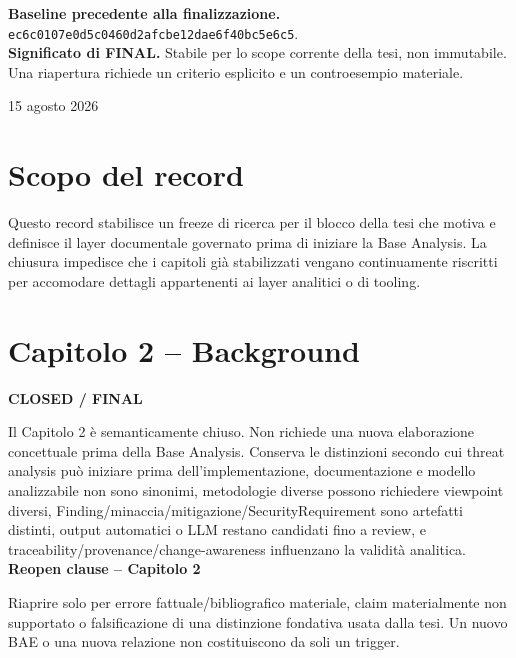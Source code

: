 \documentclass[11pt,a4paper]{article}
\newenvironment{closedbox}[1]{\def\FrameCommand{\fcolorbox{ddtagreen}{ddtagray}}\MakeFramed{\advance\hsize-2\width\FrameRestore}\noindent\textbf{#1}\par\smallskip}{\endMakeFramed}
\newenvironment{reopenbox}[1]{\def\FrameCommand{\fcolorbox{ddtaorange}{ddtagray}}\MakeFramed{\advance\hsize-2\width\FrameRestore}\noindent\textbf{#1}\par\smallskip}{\endMakeFramed}
\begin{document}
\begin{titlepage}\centering\vspace*{2cm}{\Large Documentation-Driven Threat Analysis\par}\vspace{0.8cm}{\Huge\bfseries Thesis Chapters 2--4\par}\vspace{0.3cm}{\LARGE Closure and reopen record\par}\vspace{1cm}{\large Freeze del background, research gap e documentation metamodel prima della Base Analysis\par}\vfill\begin{minipage}{0.84\textwidth}\small
\textbf{Baseline precedente alla finalizzazione.} \nolinkurl{ec6c0107e0d5c0460d2afcbe12dae6f40bc5e6c5}.\\[0.5em]
\textbf{Significato di FINAL.} Stabile per lo scope corrente della tesi, non immutabile. Una riapertura richiede un criterio esplicito e un controesempio materiale.\end{minipage}\vfill{\large 15 agosto 2026\par}\end{titlepage}
\tableofcontents\newpage
\section{Scopo del record}
Questo record stabilisce un freeze di ricerca per il blocco della tesi che motiva e definisce il layer documentale governato prima di iniziare la Base Analysis. La chiusura impedisce che i capitoli già stabilizzati vengano continuamente riscritti per accomodare dettagli appartenenti ai layer analitici o di tooling.

\section{Capitolo 2 -- Background}
\begin{closedbox}{CLOSED / FINAL}
Il Capitolo 2 è semanticamente chiuso. Non richiede una nuova elaborazione concettuale prima della Base Analysis.
\end{closedbox}
Conserva le distinzioni secondo cui threat analysis può iniziare prima dell'implementazione, documentazione e modello analizzabile non sono sinonimi, metodologie diverse possono richiedere viewpoint diversi, Finding/minaccia/mitigazione/SecurityRequirement sono artefatti distinti, output automatici o LLM restano candidati fino a review, e traceability/provenance/change-awareness influenzano la validità analitica.
\begin{reopenbox}{Reopen clause -- Capitolo 2}
Riaprire solo per errore fattuale/bibliografico materiale, claim materialmente non supportato o falsificazione di una distinzione fondativa usata dalla tesi. Un nuovo BAE o una nuova relazione non costituiscono da soli un trigger.
\end{reopenbox}
\end{document}
